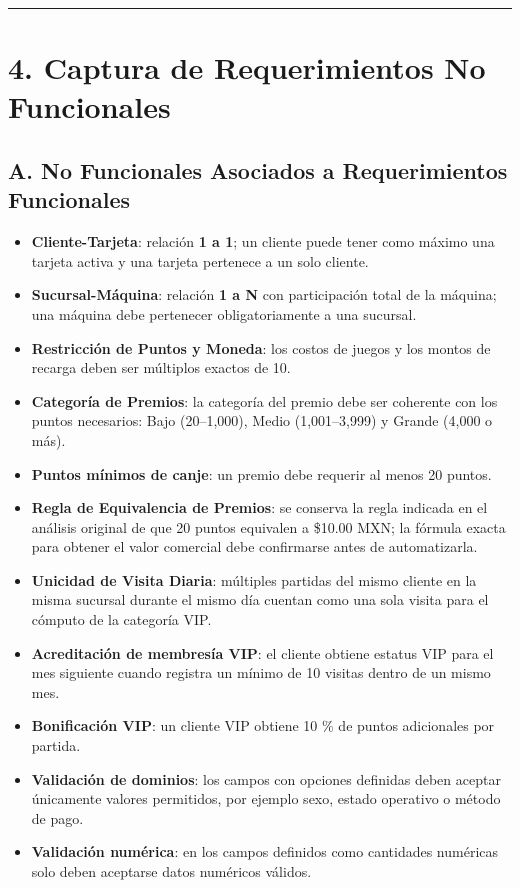 \documentclass[12pt,a4paper]{article}
\begin{document}
\vspace{1em}
\noindent\rule{\textwidth}{0.4pt}
\vspace{1em}

\section*{4. Captura de Requerimientos No Funcionales}

\subsection*{A. No Funcionales Asociados a Requerimientos Funcionales}

\begin{itemize}
    \item \textbf{Cliente-Tarjeta}: relación \textbf{1 a 1}; un cliente puede tener como máximo una tarjeta activa y una tarjeta pertenece a un solo cliente.
    \item \textbf{Sucursal-Máquina}: relación \textbf{1 a N} con participación total de la máquina; una máquina debe pertenecer obligatoriamente a una sucursal.
    \item \textbf{Restricción de Puntos y Moneda}: los costos de juegos y los montos de recarga deben ser múltiplos exactos de 10.
    \item \textbf{Categoría de Premios}: la categoría del premio debe ser coherente con los puntos necesarios: Bajo (20--1,000), Medio (1,001--3,999) y Grande (4,000 o más).
    \item \textbf{Puntos mínimos de canje}: un premio debe requerir al menos 20 puntos.
    \item \textbf{Regla de Equivalencia de Premios}: se conserva la regla indicada en el análisis original de que 20 puntos equivalen a \$10.00 MXN; la fórmula exacta para obtener el valor comercial debe confirmarse antes de automatizarla.
    \item \textbf{Unicidad de Visita Diaria}: múltiples partidas del mismo cliente en la misma sucursal durante el mismo día cuentan como una sola visita para el cómputo de la categoría VIP.
    \item \textbf{Acreditación de membresía VIP}: el cliente obtiene estatus VIP para el mes siguiente cuando registra un mínimo de 10 visitas dentro de un mismo mes.
    \item \textbf{Bonificación VIP}: un cliente VIP obtiene 10 \% de puntos adicionales por partida.
    \item \textbf{Validación de dominios}: los campos con opciones definidas deben aceptar únicamente valores permitidos, por ejemplo sexo, estado operativo o método de pago.
    \item \textbf{Validación numérica}: en los campos definidos como cantidades numéricas solo deben aceptarse datos numéricos válidos.
\end{itemize}
\end{document}
